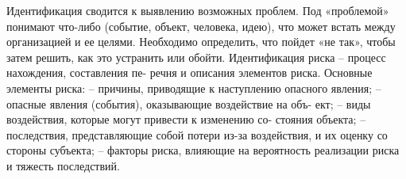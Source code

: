 Идентификация сводится к выявлению возможных проблем. 
Под «проблемой» понимают что-либо (событие, объект, человека, идею), что может встать между организацией и ее целями.
Необходимо определить, что пойдет «не так», чтобы затем решить, как это устранить
или обойти.
Идентификация риска – процесс нахождения, составления пе-
речня и описания элементов риска.
Основные элементы риска:
– причины, приводящие к наступлению опасного явления;
– опасные явления (события), оказывающие воздействие на объ-
ект;
– виды воздействия, которые могут привести к изменению со-
стояния объекта;
– последствия, представляющие собой потери из-за воздействия,
и их оценку со стороны субъекта;
– факторы риска, влияющие на вероятность реализации риска
и тяжесть последствий.
